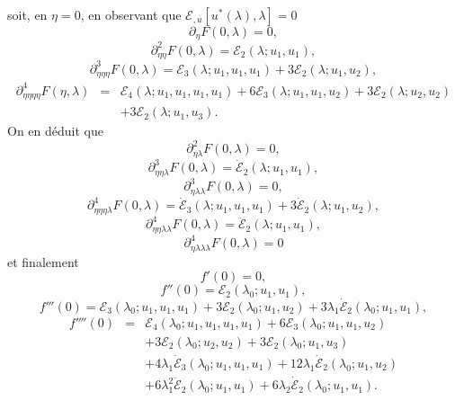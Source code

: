 \documentclass{article}
\begin{document}
soit, en $η = 0$, en observant que $ℰ_{, u} [u^{\ast} (λ),
λ] = 0$
\begin{equation} \partial_{η} F (0, λ) = 0, \end{equation}
\begin{equation} \partial_{η  η}^2 F (0, λ) =ℰ_2 (λ ;
   u_1, u_1), \end{equation}
\begin{equation} \partial_{η  η  η}^3 F (0, λ) =ℰ_3
   (λ ; u_1, u_1, u_1) + 3ℰ_2 (λ ; u_1, u_2), \end{equation}
\begin{eqnarray}
  \partial_{η  η  η  η}^4 F (η,
  λ) & = & ℰ_4 (λ ; u_1, u_1, u_1, u_1) + 6ℰ_3
  (λ ; u_1, u_1, u_2) + 3ℰ_2 (λ ; u_2, u_2) \nonumber\\
  &  &  + 3ℰ_2 (λ ; u_1, u_3) . \nonumber
\end{eqnarray}
On en déduit que
\begin{equation} \partial_{η  λ}^2 F (0, λ) = 0, \end{equation}
\begin{equation} \partial_{η  η  λ}^3 F (0, λ) =
   \dot{ℰ}_2 (λ ; u_1, u_1), \end{equation}
\begin{equation} \partial_{η  λ  λ}^3 F (0, λ) = 0, \end{equation}
\begin{equation} \partial_{η  η  η  λ}^4 F (0,
   λ) = \dot{ℰ}_3 (λ ; u_1, u_1, u_1) + 3
   \dot{ℰ}_2 (λ ; u_1, u_2), \text{} \text{} \end{equation}
\begin{equation} \partial_{η  η  λ  λ}^4 F (0,
   λ) = \ddot{ℰ}_2 (λ ; u_1, u_1), \end{equation}
\begin{equation} \partial_{η  λ  λ  λ}^4 F (0,
   λ) = 0 \end{equation}
et finalement
\begin{equation} f' (0) = 0, \end{equation}
\begin{equation} f'' (0) =ℰ_2 (λ_0 ; u_1, u_1), \end{equation}
\begin{equation} f''' (0) =ℰ_3 (λ_0 ; u_1, u_1, u_1) + 3ℰ_2
   (λ_0 ; u_1, u_2) + 3 λ_1  \dot{ℰ}_2 (λ_0 ; u_1,
   u_1), \end{equation}
\begin{eqnarray}
  f'''' (0) & = & ℰ_4 (λ_0 ; u_1, u_1, u_1, u_1) +
  6ℰ_3 (λ_0 ; u_1, u_1, u_2) \nonumber\\
  &  &  + 3ℰ_2 (λ_0 ; u_2, u_2) + 3ℰ_2
  (λ_0 ; u_1, u_3) \nonumber\\
  &  &  + 4 λ_1  \dot{ℰ}_3 (λ_0 ; u_1, u_1,
  u_1) + 12 λ_1  \dot{ℰ}_2 (λ_0 ; u_1, u_2) \nonumber\\
  &  &  + 6 λ_1^2  \ddot{ℰ}_2 (λ_0 ; u_1, u_1)
  + 6 λ_2  \dot{ℰ}_2 (λ_0 ; u_1, u_1) . \nonumber
\end{eqnarray}
\end{document}
